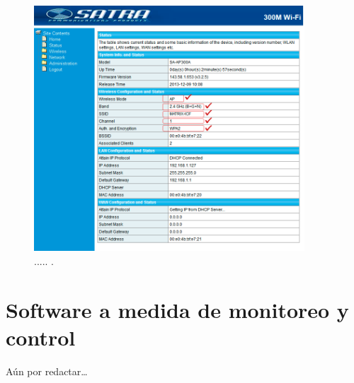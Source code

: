 \begin{figure}[htpb]
\centering 
\includegraphics[width=0.9\textwidth]{./Figures/configuracionfinal.png}
\caption{..... .}
\label{fig:configuracionfinal}
\end{figure}

\section{Software a medida de monitoreo y control}

Aún  por redactar…

